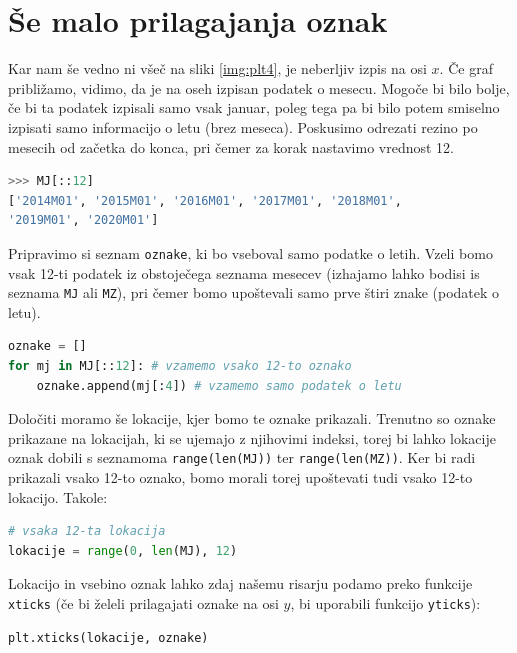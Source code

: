 \section{Še malo prilagajanja oznak}
Kar nam še vedno ni všeč na sliki \ref{img:plt4}, je neberljiv izpis na osi $x$. Če graf približamo, vidimo, da je na oseh izpisan podatek o mesecu. Mogoče bi bilo bolje, če bi ta podatek izpisali samo vsak januar, poleg tega pa bi bilo potem smiselno izpisati samo informacijo o letu (brez meseca). Poskusimo odrezati rezino po mesecih od začetka do konca, pri čemer za korak nastavimo vrednost 12.
\begin{lstlisting}[language=Python, showstringspaces=false]
>>> MJ[::12]
['2014M01', '2015M01', '2016M01', '2017M01', '2018M01',
'2019M01', '2020M01']
\end{lstlisting}
Pripravimo si seznam \texttt{oznake}, ki bo vseboval samo podatke o letih. Vzeli bomo vsak 12-ti podatek iz obstoječega seznama mesecev (izhajamo lahko bodisi is seznama \texttt{MJ} ali \texttt{MZ}), pri čemer bomo upoštevali samo prve štiri znake (podatek o letu). 
\begin{lstlisting}[language=Python, showstringspaces=false]
oznake = []
for mj in MJ[::12]: # vzamemo vsako 12-to oznako
    oznake.append(mj[:4]) # vzamemo samo podatek o letu
\end{lstlisting}
Določiti moramo še lokacije, kjer bomo te oznake prikazali. Trenutno so oznake prikazane na lokacijah, ki se ujemajo z njihovimi indeksi, torej bi lahko lokacije oznak dobili s seznamoma \texttt{range(len(MJ))} ter \texttt{range(len(MZ))}. Ker bi radi prikazali vsako 12-to oznako, bomo morali torej upoštevati tudi vsako 12-to lokacijo. Takole:
\begin{lstlisting}[language=Python, showstringspaces=false]
# vsaka 12-ta lokacija
lokacije = range(0, len(MJ), 12) 
\end{lstlisting}

Lokacijo in vsebino oznak lahko zdaj našemu risarju podamo preko funkcije \texttt{xticks} (če bi želeli prilagajati oznake na osi $y$, bi uporabili funkcijo \texttt{yticks}):
\begin{lstlisting}[language=Python, showstringspaces=false]
plt.xticks(lokacije, oznake)
\end{lstlisting}


